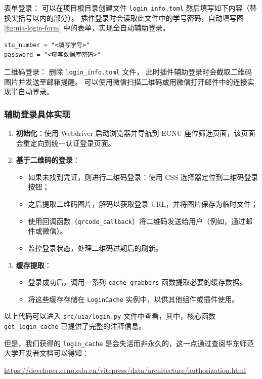 \begin{rmr}[切换表单登录和二维码登录]
    \quad 表单登录：
    可以在项目根目录创建文件 \verb`login_info.toml`
    然后填写如下内容（替换尖括号以内的部分）。
    插件登录时会读取此文件中的学号密码，自动填写图\ref{fig:uia-login-form} 中的表单，实现全自动辅助登录。
    \begin{verbatim}
stu_number = "<填写学号>"
password = "<填写数据库密码>" \end{verbatim}

    \quad 二维码登录：
    删除 \verb`login_info.toml` 文件，
    此时插件辅助登录时会截取二维码图片并发送至邮箱提醒。
    可以使用微信扫描二维码或用微信打开邮件中的连接实现半自动登录。
\end{rmr}

\subsubsection{辅助登录具体实现}
\begin{enumerate}
    \item \textbf{初始化}：使用 Webdriver 启动浏览器并导航到 ECNU 座位筛选页面，该页面会重定向到统一认证登录页面。

    \item \textbf{基于二维码的登录}：
    \begin{itemize}
        \item 如果未找到凭证，则进行二维码登录：使用 CSS 选择器定位到二维码登录按钮；
        \item 之后提取二维码图片，解码以获取登录 URL，并将图片保存为临时文件；
        \item 使用回调函数（\texttt{qrcode\_callback}）将二维码发送给用户（例如，通过邮件或微信）。
        \item 监控登录状态，处理二维码过期后的刷新。
    \end{itemize}

    \item \textbf{缓存提取}：
    \begin{itemize}
        \item 登录成功后，调用一系列 \texttt{cache\_grabbers} 函数提取必要的缓存数据。
        \item 将这些缓存存储在 \texttt{LoginCache} 实例中，以供其他组件或插件使用。
    \end{itemize}
\end{enumerate}

\begin{note}
    以上代码可以进入 \texttt{src/uia/login.py} 文件中查看，其中，核心函数 \texttt{get\_login\_cache} 已提供了完整的注释信息。

    但是，我们获得的 \texttt{login\_cache} 是会失活而非永久的，这一点通过查阅华东师范大学开发者文档可以得知：

    \href{https://developer.ecnu.edu.cn/vitepress/data/architecture/authorization.html}{\underline{https://developer.ecnu.edu.cn/vitepress/data/architecture/authorization.html}}
\end{note}

